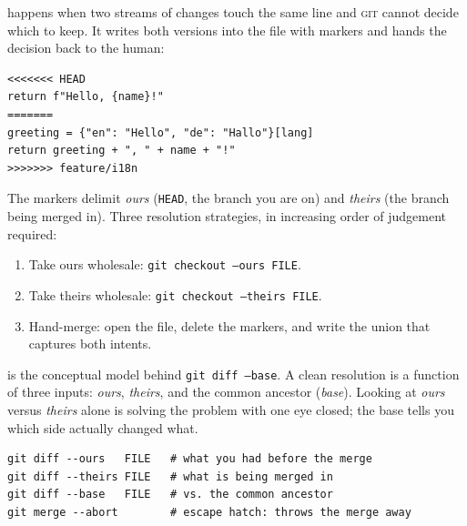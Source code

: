 \documentclass{../sharedAssets/tufte}
\begin{document}

 happens when two streams of changes touch
the same line and \textsc{git} cannot decide which to keep. It writes
both versions into the file with markers and hands the decision back
to the human:

\begin{fullwidth}
\begin{verbatim}
<<<<<<< HEAD
return f"Hello, {name}!"
=======
greeting = {"en": "Hello", "de": "Hallo"}[lang]
return greeting + ", " + name + "!"
>>>>>>> feature/i18n
\end{verbatim}
\end{fullwidth}

\noindent
The markers delimit \emph{ours} (\texttt{HEAD}, the branch you are on)
and \emph{theirs} (the branch being merged in). Three resolution
strategies, in increasing order of judgement required:

\begin{enumerate}
  \item Take ours wholesale: \texttt{git checkout --ours FILE}.
  \item Take theirs wholesale: \texttt{git checkout --theirs FILE}.
  \item Hand-merge: open the file, delete the markers, and write the
        union that captures both intents.
\end{enumerate}


 is the conceptual model behind
\texttt{git diff --base}. A clean resolution is a function of three
inputs: \emph{ours}, \emph{theirs}, and the common ancestor (\emph{base}).
Looking at \emph{ours} versus \emph{theirs} alone is solving the problem
with one eye closed; the base tells you which side actually changed
what.

\begin{fullwidth}
\begin{verbatim}
git diff --ours   FILE   # what you had before the merge
git diff --theirs FILE   # what is being merged in
git diff --base   FILE   # vs. the common ancestor
git merge --abort        # escape hatch: throws the merge away
\end{verbatim}
\end{fullwidth}
\end{document}
